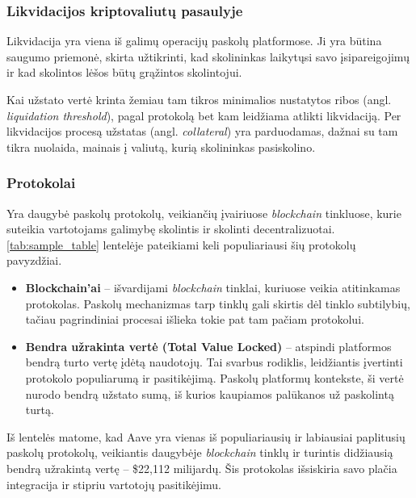 \documentclass{VUMIFPSkursinis}
\begin{document}
\subsubsection{Likvidacijos kriptovaliutų pasaulyje}

Likvidacija yra viena iš galimų operacijų paskolų platformose. Ji yra būtina saugumo priemonė, skirta užtikrinti, kad skolininkas laikytųsi savo įsipareigojimų ir kad skolintos lėšos būtų grąžintos skolintojui.

Kai užstato vertė krinta žemiau tam tikros minimalios nustatytos ribos (angl. \textit{liquidation threshold}), pagal protokolą bet kam leidžiama atlikti likvidaciją. Per likvidacijos procesą užstatas (angl. \textit{collateral}) yra parduodamas, dažnai su tam tikra nuolaida, mainais į valiutą, kurią skolininkas pasiskolino. \cite{venusliquidations}

\subsubsection{Protokolai}

Yra daugybė paskolų protokolų, veikiančių įvairiuose \textit{blockchain} tinkluose, kurie suteikia vartotojams galimybę skolintis ir skolinti decentralizuotai. \ref{tab:sample_table} lentelėje pateikiami keli populiariausi šių protokolų pavyzdžiai. 

\begin{itemize}
  \item \textbf{Blockchain'ai} – išvardijami \textit{blockchain} tinklai, kuriuose veikia atitinkamas protokolas. Paskolų mechanizmas tarp tinklų gali skirtis dėl tinklo subtilybių, tačiau pagrindiniai procesai išlieka tokie pat tam pačiam protokolui.
  \item \textbf{Bendra užrakinta vertė (Total Value Locked)} – atspindi platformos bendrą turto vertę įdėtą naudotojų. Tai svarbus rodiklis, leidžiantis įvertinti protokolo populiarumą ir pasitikėjimą. Paskolų platformų kontekste, ši vertė nurodo bendrą užstato sumą, iš kurios kaupiamos palūkanos už paskolintą turtą.
  \end{itemize}
  
Iš lentelės matome, kad Aave yra vienas iš populiariausių ir labiausiai paplitusių paskolų protokolų, veikiantis daugybėje \textit{blockchain} tinklų ir turintis didžiausią bendrą užrakintą vertę – \$22,112 milijardų. Šis protokolas išsiskiria savo plačia integracija ir stipriu vartotojų pasitikėjimu.
\end{document}
